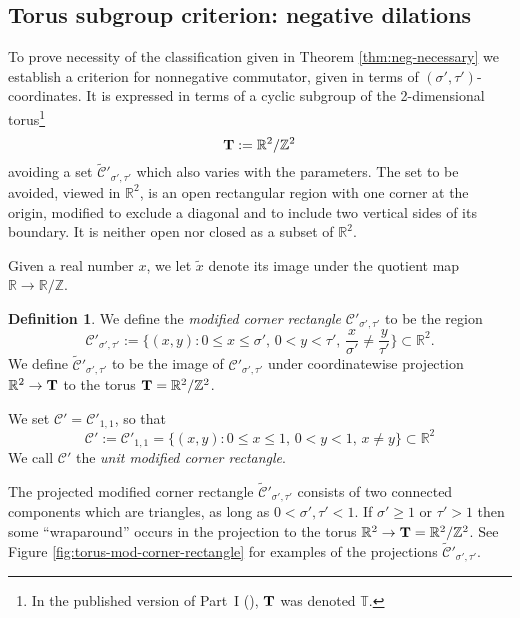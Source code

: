 \documentclass[11pt, letterpaper, reqno]{amsart}
\theoremstyle{definition}
\newtheorem{defi}[thm]{Definition}
\theoremstyle{remark}
\numberwithin{equation}{section}
\newcommand{\RR}{\ensuremath{\mathbb{R}}}
\newcommand{\ZZ}{\ensuremath{\mathbb{Z}}}
\newcommand{\TT}{\mathbb{T}}
\newcommand{\bT}{{\bf T}}
\newcommand{\cCprime}{{\mathcal{C}'}}
\newcommand{\cCprimebar}{\widetilde{\mathcal{C}}'}
\newcommand{\tbetap}{{\sigma'}}
\newcommand{\trhop}{{\tau'}}
\begin{document}
%
%
\subsection{Torus subgroup criterion: negative dilations}
\label{sec:neg-disjoint}

To prove necessity of the classification given in Theorem \ref{thm:neg-necessary}
we establish a criterion for nonnegative commutator, given in terms of
$(\tbetap, \trhop)$-coordinates.
It is expressed in terms of a cyclic subgroup of the 2-dimensional torus\footnote{In the published
version of Part~I (\cite{LagR:2018a}), $\bT$ was denoted $\TT$.}
$$\bT := \RR^2/\ZZ^2$$
avoiding a set $\cCprimebar_{\tbetap, \trhop}$
which   also varies with the parameters. 
The set to be avoided, viewed in $\RR^2$,  
is an open rectangular region  with one corner at the origin,
modified to exclude a diagonal  
and to include two vertical sides of its boundary.
It is neither  open nor  closed as a subset of $\RR^2$.
 
Given a real number $x$, we let $\widetilde{x}$ denote its image under the quotient map $\RR \to \RR/\ZZ$.

\begin{defi}\label{defn:mod-corner-rectangle}
We define the {\em modified corner rectangle} 
$\cCprime_{\tbetap,\trhop}$ to be the    region
\begin{equation}\label{cCprime}
\cCprime_{\tbetap,\trhop} := 
\{(x,y) : 0\leq x \leq \tbetap, \, 0<y<\trhop,\, \frac{x}{\tbetap} \neq \frac{y}{\trhop} \} \subset \RR^2.
\end{equation}
We define $\cCprimebar_{\tbetap,\trhop}$ to be the image of 
$\cCprime_{\tbetap,\trhop}$ under coordinatewise projection $\RR^2 \to \bT$
to the torus ${ \bT = \RR^2 /\ZZ^2 }$.

We set $\cCprime = \cCprime_{1,1}$, so that 
\begin{equation}\label{cCprime11}
\cCprime := \cCprime_{1,1} = \{(x,y) : 0\leq x \leq 1, \, 0<y<1,\, x \neq y \} \subset \RR^2
\end{equation}
We call $\cCprime$ the {\em unit modified corner rectangle}.
\end{defi}


The  projected modified corner rectangle $\cCprimebar_{\tbetap, \trhop}$ consists of 
two connected components which are %
triangles, as long as $0 < \tbetap, \trhop < 1$.
If $\tbetap \geq 1$ or $\trhop > 1$ then some ``wraparound'' occurs in the projection to the torus
$\RR^2 \to \bT= \RR^2 / \ZZ^2$.
See Figure \ref{fig:torus-mod-corner-rectangle} 
for examples of the projections $\cCprimebar_{\tbetap,\trhop}$.
\end{document}
